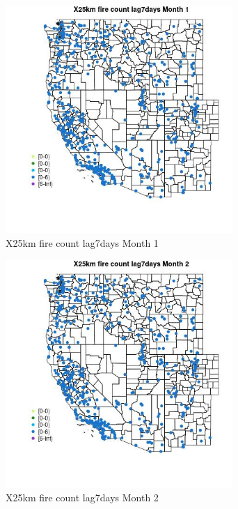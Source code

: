\begin{figure} 
\centering  
\includegraphics[width=0.77\textwidth]{Code_Outputs/Report_ML_input_PM25_Step4_part_e_de_duplicated_aves_compiled_2019-05-14wNAs_MapObsMo1X25km_fire_count_lag7days.jpg} 
\caption{\label{fig:Report_ML_input_PM25_Step4_part_e_de_duplicated_aves_compiled_2019-05-14wNAsMapObsMo1X25km_fire_count_lag7days}X25km fire count lag7days Month 1} 
\end{figure} 
 

\begin{figure} 
\centering  
\includegraphics[width=0.77\textwidth]{Code_Outputs/Report_ML_input_PM25_Step4_part_e_de_duplicated_aves_compiled_2019-05-14wNAs_MapObsMo2X25km_fire_count_lag7days.jpg} 
\caption{\label{fig:Report_ML_input_PM25_Step4_part_e_de_duplicated_aves_compiled_2019-05-14wNAsMapObsMo2X25km_fire_count_lag7days}X25km fire count lag7days Month 2} 
\end{figure} 
 

